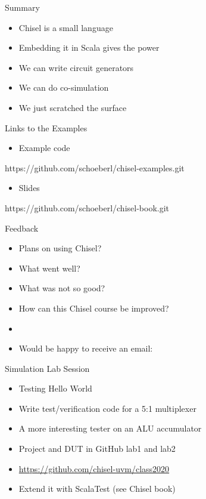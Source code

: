 \begin{frame}[fragile]{Summary}
\begin{itemize}
\item Chisel is a small language
\item Embedding it in Scala gives the power
\item We can write circuit generators
\item We can do co-simulation
\item We just scratched the surface
\end{itemize}
\end{frame}

\begin{frame}[fragile]{Links to the Examples}
\begin{itemize}
\item Example code
\end{itemize}
\begin{chisel}
https://github.com/schoeberl/chisel-examples.git
\end{chisel}
\begin{itemize}
\item Slides
\end{itemize}
\begin{chisel}
https://github.com/schoeberl/chisel-book.git
\end{chisel}
\end{frame}

\begin{frame}[fragile]{Feedback}
\begin{itemize}
\item Plans on using Chisel?
\item What went well?
\item What was not so good?
\item How can this Chisel course be improved?
\item
\item Would be happy to receive an email: 
\end{itemize}
\end{frame}

\begin{frame}[fragile]{Simulation Lab Session}
\begin{itemize}
\item Testing Hello World
\item Write test/verification code for a 5:1 multiplexer
\item A more interesting tester on an ALU accumulator
\item Project and DUT in GitHub lab1 and lab2
\item \url{https://github.com/chisel-uvm/class2020}
\item Extend it with ScalaTest (see Chisel book)
\end{itemize}
\end{frame}

